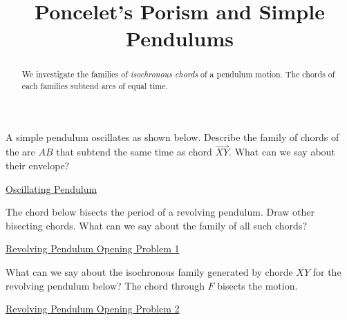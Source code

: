 \documentclass{ximera}
\title{Poncelet's Porism and Simple Pendulums}
\begin{document}
\begin{abstract}
We investigate the families of \emph{isochronous chords} of a pendulum motion. The chords of each families subtend arcs of equal time.
\end{abstract}
\maketitle




\begin{exploration}
A simple pendulum oscillates as shown below. Describe the family of chords of the arc $AB$ that subtend the same time as chord $\overrightarrow{XY}$. What can we say about their envelope?

\begin{onlineOnly}
    \begin{center}
\end{center}
\end{onlineOnly}

\href{https://www.desmos.com/calculator/pleca0vkjw}{Oscillating Pendulum}

\end{exploration}

\begin{exploration}
The chord below bisects the period of a revolving pendulum. Draw other bisecting chords. What can we say about the family of all such chords?

\begin{onlineOnly}
    \begin{center}
\end{center}
\end{onlineOnly}

\href{https://www.desmos.com/calculator/zlyigzhmpn}{Revolving Pendulum Opening Problem 1}

\end{exploration}

\begin{exploration}
What can we say about the isochronous family generated by chorde $\overline{XY}$ for the revolving pendulum below? The chord through $F$ bisects the motion.

\begin{onlineOnly}
    \begin{center}
\end{center}
\end{onlineOnly}

\href{https://www.desmos.com/calculator/1kyfdn6yyc}{Revolving Pendulum Opening Problem 2}

\end{exploration}
\end{document}

